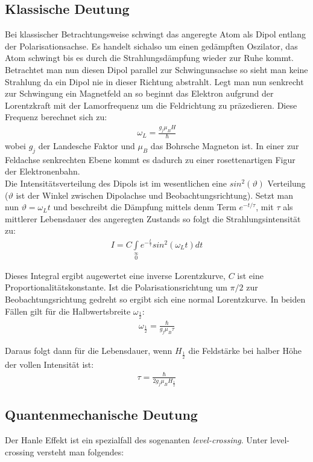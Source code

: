 \documentclass[12pt]{article}
\begin{document}
\subsection{Klassische Deutung}
Bei klassischer Betrachtungsweise schwingt das angeregte Atom als Dipol entlang der Polarisationsachse. Es handelt sichalso um einen gedämpften
Oszilator, das Atom schwingt bis es durch die Strahlungsdämpfung wieder zur Ruhe kommt. Betrachtet man nun diesen Dipol parallel zur 
Schwingunsachse so sieht man keine Strahlung da ein Dipol nie in dieser Richtung abstrahlt. Legt man nun senkrecht zur Schwingung ein
Magnetfeld an so beginnt das Elektron aufgrund der Lorentzkraft mit der Lamorfrequenz um die Feldrichtung zu präzedieren. Diese Frequenz 
berechnet sich zu:
\begin{align}
 \omega_L=\frac{g_j \mu_B H}{\hbar}
\end{align}
wobei $g_j$ der Landesche Faktor und $\mu_B$ das Bohrsche Magneton ist. In einer zur Feldachse senkrechten Ebene kommt
es dadurch zu einer rosettenartigen Figur der Elektronenbahn.
\\
Die Intensitätsverteilung des Dipols ist im wesentlichen eine $sin^2(\vartheta)$ Verteilung ($\vartheta$ ist der
Winkel zwischen Dipolachse und Beobachtungsrichtung). Setzt man nun $\vartheta = \omega_L t$ und beschreibt
die Dämpfung mittels denm Term $e^{-t/\tau}$, mit $\tau$ als mittlerer Lebensdauer des angeregten Zustands so 
folgt die Strahlungsintensität zu:
\begin{align}
 I = C \int \limits_{0} \limits^{\infty} e^{-\frac{t}{\tau}}sin^2(\omega_L t) dt
\end{align}

Dieses Integral ergibt augewertet eine inverse Lorentzkurve, $C$ ist eine Proportionalitätskonstante. Ist die
Polarisationsrichtung um $\pi/2$ zur Beobachtungsrichtung gedreht so ergibt sich eine normal Lorentzkurve.
In beiden Fällen gilt für die Halbwertsbreite $\omega_{\frac{1}{2}}$:
\begin{align}
 \omega_{\frac{1}{2}}= \frac{\hbar}{g_j \mu_B\tau}
\end{align}

Daraus folgt dann für die Lebensdauer, wenn $H_{\frac{1}{2}}$ die Feldstärke bei halber Höhe der vollen Intensität ist:
\begin{align}
 \label{livetime_classic} \tau = \frac{\hbar}{2 g_j \mu_B H_{\frac{1}{2}}}
\end{align}

\subsection{Quantenmechanische Deutung}
Der Hanle Effekt ist ein spezialfall des sogenanten \textit{level-crossing}. Unter level-crossing versteht man folgendes:
\end{document}
